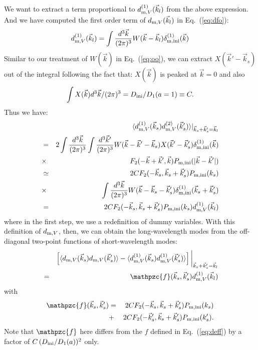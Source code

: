 \documentclass[prd,amsmath,amssymb,floatfix,superscriptaddress,nofootinbib,twocolumn]{revtex4-1}
\def\be{\begin{equation}}
\def\ee{\end{equation}}
\def\bea{\begin{eqnarray}}
\def\eea{\end{eqnarray}}
\newcommand{\ini}{\rm ini}
\newcommand{\vs}{\nonumber\\}
\newcommand{\vk}{\vec{k}}
\newcommand{\ec}[1]{Eq.~(\ref{eq:#1})}
\newcommand{\eql}[1]{\label{eq:#1}}
\begin{document}
We want to extract a term proportional to $d_{{\rm m},V}^{(1)}(\vec{k}_l)$ from the above expression. And we have computed the first order term of $d_{{\rm m},V}(\vec{k}_l)$ in \ec{dfo}:
\be
d_{{\rm m},V}^{(1)}(\vec{k}_l) = \int \frac{d^3 \vk}{(2\pi)^3} W(\vec{k}-\vk_l) \delta_{\rm m,ini}^{(1)}(\vk)  
\ee
Similar to our treatment of $W(\vk)$ in \ec{oo}, we can extract $X(\vk'-\vk_s)$ out of the integral following the fact that: $X(\vk)$ is peaked at $\vk=0$ and also
\be 
\int X(\vk){d^3 \vec{k}}/{(2\pi)^3}=D_{\ini}/D_{1}(a=1)\equiv C. \eql{apr}
\ee 
Thus we have:
\bea 
&&\langle d_{{\rm m},V}^{(1)}(\vec{k}_s) d_{{\rm m},V}^{(2)}(\vec{k}'_s) \rangle|_{\vk_s+\vk_s'=\vk_l} \nonumber \\
&=&2\int \frac{d^3 \vec{k}}{(2\pi)^3}\int \frac{d^3 \vec{k}'}{(2\pi)^3}{W}(\vec{k}-\vk'-\vec{k}_s)X(\vec{k}'-\vec{k}'_s)\delta^{(1)}_{\rm m,ini}(\vec{k})\vs
&\times & F_{2}(-\vk+\vk',\vk)P_{\rm m,ini}(|\vk-\vk'|) \vs
&\simeq & 2 CF_{2}(-\vk_s, \vk_s+\vk_s')P_{\rm m,ini}(k_s)\vs
&\times &\int \frac{d^3 \vec{k}}{(2\pi)^3}{W}(\vec{k}-\vec{k}_s-\vk_s') \delta^{(1)}_{\rm m,ini}(\vec{k}_s+\vec{k}'_s)\nonumber \\
&=&2CF_{2}(-\vk_s, \vk_s+\vk_s')P_{\rm m,ini}(k_s)d_{{\rm m},V}^{(1)}(\vec{k}_l)
\eea 
where in the first step, we use a redefinition of dummy variables. With this definition of $d_{{\rm m},V}$, then, we can obtain the long-wavelength modes from the off-diagonal two-point functions of short-wavelength modes:
\bea 
&&\left[ \langle d_{{\rm m},V}(\vk_s)d_{{\rm m},V}(\vk_s') \rangle-\langle d^{(1)}_{{\rm m},V}(\vk_s)d^{(1)}_{{\rm m},V}(\vk_s') \rangle\right]\bigg|_{\vk_s+\vk_s'=\vk_l}\vs
& =&\mathpzc{f}(\vec{k}_s,\vec{k}_s'){d}^{(1)}_{{\rm m},V}(\vec{k}_l) \eql{2ptdd}
\eea 
with 
\bea
\mathpzc{f}(\vec{k}_s,\vec{k}_s')&=&2CF_2(-\vec{k}_s,\vec{k}_s+\vec{k}_s')P_{\rm m,ini}(k_s)\vs
&+&2CF_2(-\vec{k}_s',\vec{k}_s+\vec{k}_s')P_{\rm m,ini}(k_s') .      
\eea 
Note that $\mathpzc{f}$ here differs from the $f$ defined in \ec{deff} by a factor of $C\,(D_{\ini}/D_{1}(a))^2$ only.
\end{document}
